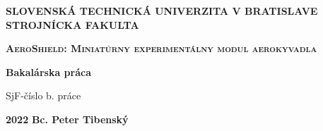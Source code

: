 \renewcommand\thepage{\roman{page}}
\thispagestyle{empty}

\noindent \begin{center}
\textbf{{\large{}SLOVENSKÁ TECHNICKÁ UNIVERZITA V BRATISLAVE}}\\
\textbf{{\large{}STROJNÍCKA FAKULTA}}\textbf{\large{} }\\
\vspace{3cm}
\par\end{center}

\noindent \begin{center}
\vspace{3cm}
\par\end{center}



\begin{center}
\textbf{\textsc{\Large{}AeroShield: Miniatúrny experimentálny modul aerokyvadla}}\\
\par\end{center}{\Large \par}

\begin{center}
\textbf{\large{}Bakalárska práca}\\
\par\end{center}{\large \par}

\begin{center}
{\large{}SjF-číslo b. práce}\\
\par\end{center}{\large \par}



\vfill
\noindent \textbf{\large{}2022} \hfill \textbf{\large{}Bc. Peter Tibenský}
\cleardoublepage
